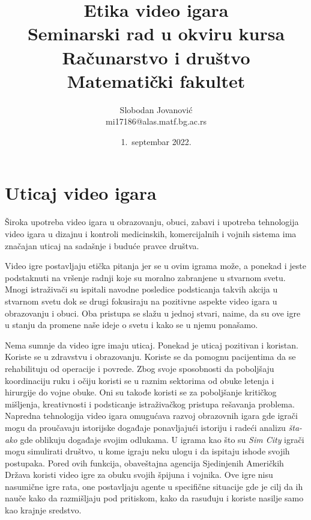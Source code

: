 \documentclass[a4paper]{article}
\begin{document}
\title{Etika video igara\\ \small{Seminarski rad u okviru kursa\\Računarstvo i društvo\\ Matematički fakultet}}

\author{Slobodan Jovanović\\ mi17186@alas.matf.bg.ac.rs}
\date{1.~septembar 2022.}
\maketitle

\tableofcontents

\newpage

\section{Uticaj video igara}
\label{sec:uvod}
Široka upotreba video igara u obrazovanju, obuci, zabavi i upotreba tehnologija
video igara u dizajnu i kontroli medicinskih, komercijalnih i vojnih sistema ima
značajan uticaj na sadašnje i buduće pravce društva.

Video igre postavljaju etička pitanja jer se u ovim igrama može, a ponekad i jeste
podstaknuti na vršenje radnji koje su moralno zabranjene u stvarnom svetu. Mnogi
istraživači su ispitali navodne posledice podsticanja takvih akcija u stvarnom svetu
dok se drugi fokusiraju na pozitivne aspekte video igara u obrazovanju i obuci. Oba
pristupa se slažu u jednoj stvari, naime, da su ove igre u stanju da promene naše ideje o
svetu i kako se u njemu ponašamo.

Nema sumnje da video igre imaju uticaj. Ponekad je uticaj pozitivan i koristan.
Koriste se u zdravstvu i obrazovanju. Koriste se da pomognu pacijentima da se rehabilituju od
operacije i povrede. Zbog svoje sposobnosti da poboljšaju koordinaciju ruku i očiju
koristi se u raznim sektorima od obuke letenja i hirurgije do vojne obuke. Oni su takođe
koristi se za poboljšanje kritičkog mišljenja, kreativnosti i podsticanje istraživačkog pristupa
rešavanja problema. Napredna tehnologija video igara omugućava razvoj obrazovnih igara gde
igrači mogu da proučavaju istorijske događaje ponavljajući istoriju i radeći analizu {\em šta-ako} gde 
oblikuju događaje svojim odlukama. U igrama kao što su {\em Sim City} igrači mogu simulirati društvo, u kome igraju neku
ulogu i da ispitaju ishode svojih postupaka. Pored ovih funkcija, obaveštajna agencija Sjedinjenih Američkih Država
koristi video igre za obuku svojih špijuna i vojnika. Ove igre nisu nasumične igre rata, 
one postavljaju agente u specifične situacije gde je cilj da ih nauče kako da
razmišljaju pod pritiskom, kako da rasuđuju i koriste nasilje samo kao krajnje sredstvo.
\newpage
\end{document}
